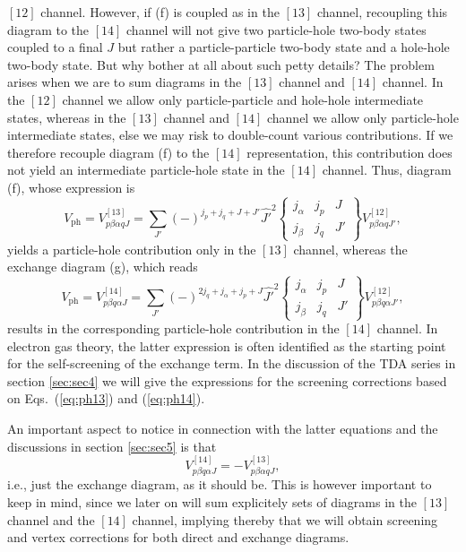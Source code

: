 \documentclass[twoside,12pt]{article}
\begin{document}
$[12]$ channel. However, if (f) is coupled as in the $[13]$ channel,
recoupling this diagram to the $[14]$ channel will not give
two particle-hole
two-body states coupled to a final $J$ but rather
a particle-particle two-body state and a hole-hole  two-body state.
But why bother at all about such petty details? The problem arises when we
are to  sum diagrams in the $[13]$ channel and $[14]$ channel.
In the $[12]$ channel we allow only particle-particle and hole-hole
intermediate states, whereas in the $[13]$ channel and $[14]$ channel
we allow only particle-hole intermediate states, else we may risk
to double-count various contributions.
If we therefore recouple
diagram (f) to the $[14]$ representation, this contribution
does not yield an intermediate particle-hole state
in the $[14]$ channel.
Thus, diagram (f), whose expression is
\begin{equation}
      V_{\mathrm{ph}}=V_{p\beta \alpha q J}^{[13]}=
      {\displaystyle \sum_{J'}}(-)^{j_p+j_q+J+J'}\hat{J'}^2
      \left\{
      \begin{array}{ccc}
       j_{\alpha}&j_p&J\\j_{\beta}&j_q&J'
      \end{array}
       \right\}
       V_{p\beta \alpha q J'}^{[12]},
       \label{eq:ph13}
\end{equation}
yields a particle-hole contribution only in the $[13]$ channel,
whereas the exchange diagram (g), which reads
\begin{equation}
      V_{\mathrm{ph}}=V_{p\beta q\alpha J}^{[14]}=
      {\displaystyle \sum_{J'}}(-)^{2j_q+j_{\alpha}+j_p+J}\hat{J'}^2
      \left\{
      \begin{array}{ccc}
       j_{\alpha}&j_p&J\\j_{\beta}&j_{q}&J'
      \end{array}
       \right\}
       V_{p\beta q\alpha J'}^{[12]},
       \label{eq:ph14}
\end{equation}
results in the corresponding particle-hole contribution in the
$[14]$ channel.
In electron gas theory, the latter expression
is often identified as the starting point for the self-screening
of the exchange term. In the discussion of the TDA series in
section \ref{sec:sec4} we will give the expressions for the screening
corrections based on Eqs.\ (\ref{eq:ph13}) and (\ref{eq:ph14}).

An important aspect to notice in connection with the latter
equations and the discussions in  section \ref{sec:sec5} is that
\begin{equation}
    V_{p\beta q\alpha J}^{[14]}=-V_{p\beta \alpha q J}^{[13]},
\end{equation}
i.e., just the exchange diagram, as it should be.
This is however important to keep in mind, since we later
on will sum explicitely sets of diagrams in the
$[13]$ channel and the $[14]$ channel, implying thereby that
we will obtain screening and vertex corrections
for  both direct and exchange  diagrams.
\end{document}
